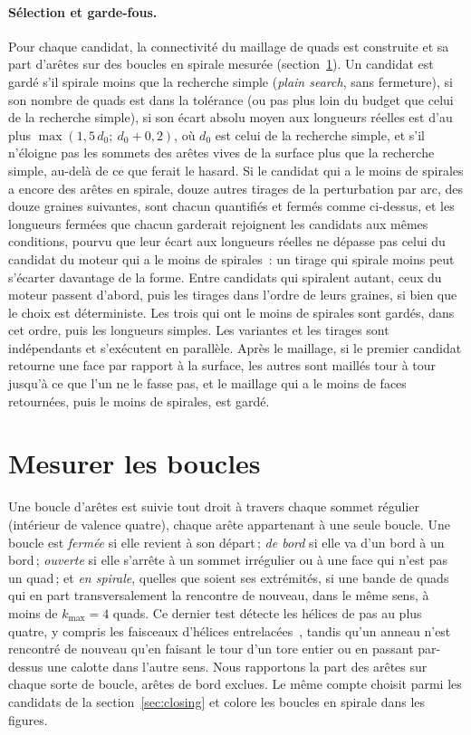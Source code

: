 \documentclass[11pt,a4paper]{article}
\begin{document}
\paragraph{Sélection et garde-fous.}
Pour chaque candidat, la connectivité du maillage de quads est construite
et sa part d'arêtes sur des boucles en spirale mesurée
(section~\ref{sec:measure}). Un candidat est gardé s'il spirale moins que la
recherche simple (\emph{plain search}, sans fermeture), si son nombre de
quads est dans la tolérance (ou pas plus loin du budget que celui de la
recherche simple), si son écart absolu moyen aux longueurs réelles est d'au
plus $\max(1,5\,d_0 ;\ d_0 + 0,2)$, où $d_0$ est celui de la recherche
simple, et s'il n'éloigne pas les sommets des arêtes vives de la surface
plus que la recherche simple, au-delà de ce que ferait le hasard. Si le
candidat qui a le moins de spirales a encore des arêtes en spirale, douze
autres tirages de la perturbation par arc, des douze graines suivantes, sont
chacun quantifiés et fermés comme ci-dessus, et les longueurs fermées que
chacun garderait rejoignent les candidats aux mêmes conditions, pourvu que
leur écart aux longueurs réelles ne dépasse pas celui du candidat du moteur
qui a le moins de spirales~: un tirage qui spirale moins peut s'écarter
davantage de la forme. Entre candidats qui spiralent autant, ceux du moteur
passent d'abord, puis les tirages dans l'ordre de leurs graines, si bien que
le choix est déterministe. Les trois qui ont le moins de spirales sont
gardés, dans cet ordre, puis les longueurs simples. Les variantes et les
tirages sont indépendants et s'exécutent en parallèle. Après
le maillage, si le premier candidat retourne une face par rapport à la
surface, les autres sont maillés tour à tour jusqu'à ce que l'un ne le fasse
pas, et le maillage qui a le moins de faces retournées, puis le moins de
spirales, est gardé.

\section{Mesurer les boucles}\label{sec:measure}

Une boucle d'arêtes est suivie tout droit à travers chaque sommet régulier
(intérieur de valence quatre), chaque arête appartenant à une seule boucle.
Une boucle est \emph{fermée} si elle revient à son départ\,; \emph{de bord}
si elle va d'un bord à un bord\,; \emph{ouverte} si elle s'arrête à un
sommet irrégulier ou à une face qui n'est pas un quad\,; et \emph{en
spirale}, quelles que soient ses extrémités, si une bande de quads qui en
part transversalement la rencontre de nouveau, dans le même sens, à moins de
$k_{\max} = 4$ quads. Ce dernier test détecte les hélices de pas au plus
quatre, y compris les faisceaux d'hélices
entrelacées~\cite{bommes2011structure}, tandis qu'un anneau n'est rencontré
de nouveau qu'en faisant le tour d'un tore entier ou en passant par-dessus
une calotte dans l'autre sens. Nous rapportons la part des arêtes sur chaque
sorte de boucle, arêtes de bord exclues. Le même compte choisit parmi les
candidats de la section~\ref{sec:closing} et colore les boucles en spirale
dans les figures.
\end{document}
